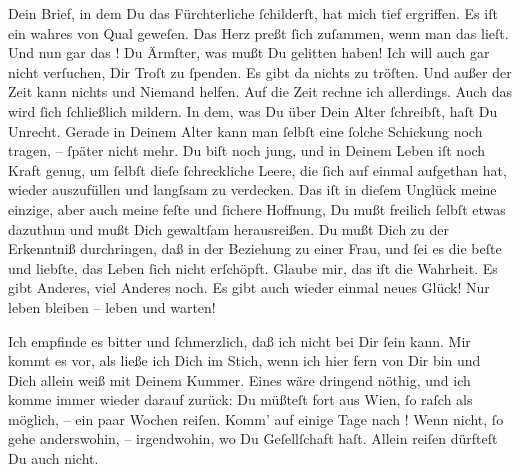 \pstart
           Dein Brief, in dem Du das Fürchterliche ſchilderſt, hat mich tief ergriffen. Es iſt
               ein wahres \label{K_L02871-3v}\label{K_L02871-3} von
               Qual geweſen. Das Herz preßt ſich zuſammen, wenn man das lieſt. Und nun gar das
                  \label{K_L02871-4v}\label{K_L02871-4}! Du
               Ärmſter, was mußt Du gelitten haben! Ich will auch gar nicht verſuchen, Dir Troſt zu
               ſpenden. Es gibt  da nichts zu tröſten. Und außer der Zeit kann nichts und Niemand helfen. Auf
               die Zeit rechne ich allerdings. Auch das wird ſich ſchließlich mildern.  In dem, was Du über {\pb}Dein Alter ſchreibſt,
               haſt Du Unrecht. Gerade in Deinem Alter kann man ſelbſt eine ſolche Schickung noch
               tragen, – ſpäter nicht mehr. Du biſt noch jung, und in Deinem Leben iſt noch Kraft
               genug, um ſelbſt dieſe ſchreckliche Leere, die ſich auf einmal aufgethan hat, wieder
               auszufüllen und \strikeout{\textcolor{gray}{zu}\textcolor{gray}{×}} langſsam \introOben{}zu\introOben{} verdecken. Das iſt \strikeout{\textcolor{gray}{×}} in dieſem Unglück meine einzige, aber auch meine feſte und ſichere Hoffnung,
               Du mußt freilich ſelbſt etwas dazuthun und mußt Dich gewaltſam herausreißen. Du mußt
               Dich zu der Erkenntniß durchringen, daß in der Beziehung zu einer Frau, und ſei es
               die beſte und liebſte, das Leben ſich nicht erſchöpft. Glaube mir, das iſt die
               Wahrheit. Es gibt Anderes, viel Anderes noch. Es gibt auch wieder einmal neues Glück!
               Nur leben bleiben – leben und warten!\pend
           
\pstart
           Ich empfinde es bitter und ſchmerzlich, daß ich nicht bei Dir ſein kann. Mir kommt es
               vor, als ließe ich Dich im Stich, wenn ich hier fern von Dir bin und Dich allein weiß
               mit Deinem Kummer. Eines wäre 
               dringend nöthig, und ich komme immer wieder darauf zurück: {\pb}Du müßteſt fort aus Wien, ſo raſch als möglich, – ein paar Wochen reiſen. Komm’ auf einige Tage
               nach \label{K_L02871-5v}\label{K_L02871-5}! Wenn nicht, ſo
               gehe anderswohin, – irgendwohin, wo Du Geſellſchaft haſt. Allein reiſen dürfteſt Du
               auch nicht.\pend
           
